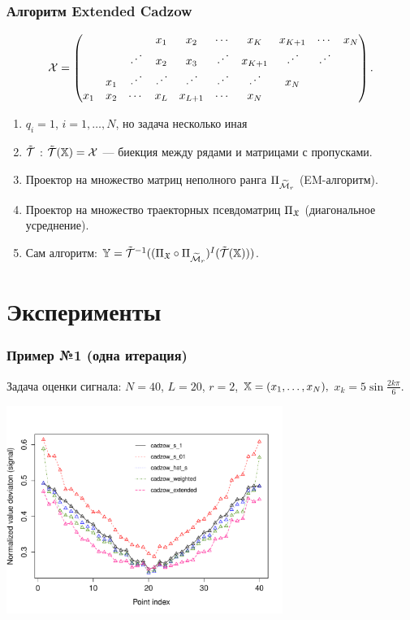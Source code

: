 \documentclass[unicode, notheorems]{beamer}
\begin{document}

\begin{frame}
    \frametitle{Алгоритм Extended Cadzow}
    \begin{equation*}
    \mathcal{X} = \begin{pmatrix}
     &  &  & x_1 & x_2 & \cdots & x_K & x_{K+1} & \cdots & x_N \\ 
     &  & \iddots & x_2 & x_3 & \iddots & x_{K+1} & \iddots & \iddots &  \\ 
     & x_1 & \iddots & \iddots & \iddots & \iddots & \iddots & x_N &  &  \\ 
    x_1 & x_2 & \cdots & x_L & x_{L+1} & \cdots & x_N &  &  & 
    \end{pmatrix}.
    \end{equation*}
    \begin{enumerate}
    \item $q_i = 1$, $i = 1, \ldots, N$, но задача несколько иная
    \item $\tilde {\mathcal{T}}$ : $\tilde {\mathcal{T}}(\mathbb{X}) = \mathcal{X}$ --- биекция между рядами и матрицами с пропусками.
    \item Проектор на множество матриц неполного ранга $\Pi_{\widetilde {\mathcal{M}}_r}$ (EM-алгоритм).
    \item Проектор на множество траекторных псевдоматриц $\Pi_{\mathfrak{X}}$ (диагональное усреднение).
    \item Сам алгоритм: $\mathbb{Y} = \tilde {\mathcal{T}}^{-1}((\Pi_{\mathfrak{X}} \circ \Pi_{\widetilde {\mathcal{M}}_r})^I (\tilde {\mathcal{T}}(\mathbb{X})))$.
    \end{enumerate}
\end{frame}
\section{Эксперименты}
\begin{frame}
  \frametitle{Пример №1 (одна итерация)}
  Задача оценки сигнала: $N = 40$, $L = 20$, $r = 2$, $\mathbb{X} = (x_{1}, \ldots, x_N),$  $x_k = 5\sin{\frac{2 k \pi}{6}}$.
\begin{center}
\includegraphics*[width = 9cm]{s1_it1.pdf}
\end{center}


\end{frame}
\end{document}
